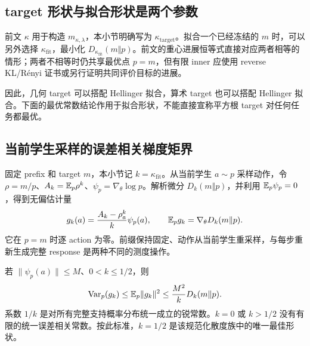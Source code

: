 \subsection{target 形状与拟合形状是两个参数}

前文 $\kappa$ 用于构造 $m_{\kappa,\lambda}$，本小节明确写为 $\kappa_{\mathrm{target}}$。拟合一个已经冻结的 $m$ 时，可以另外选择 $\kappa_{\mathrm{fit}}$，最小化 $D_{\kappa_{\mathrm{fit}}}(m\Vert p)$。前文的重心进展恒等式直接对应两者相等的情形；两者不相等时仍共享最优点 $p=m$，但有限 inner 应使用 reverse KL/Rényi 证书或另行证明共同评价目标的进展。

因此，几何 target 可以搭配 Hellinger 拟合，算术 target 也可以搭配 Hellinger 拟合。下面的最优常数结论作用于拟合形状，不能直接宣称平方根 target 对任何任务都最优。

\subsection{当前学生采样的误差相关梯度矩界}

固定 prefix 和 target $m$，本小节记 $k=\kappa_{\mathrm{fit}}$。从当前学生 $a\sim p$ 采样动作，令 $\rho=m/p$、$A_k=\mathbb E_p\rho^k$、$\psi_p=\nabla_\theta\log p$。解析微分 $D_k(m\Vert p)$，并利用 $\mathbb E_p\psi_p=0$，得到无偏估计量
\begin{equation}
 g_k(a)=\frac{A_k-\rho_a^k}{k}\psi_p(a),\qquad
 \mathbb E_pg_k=\nabla_\theta D_k(m\Vert p).
\end{equation}
它在 $p=m$ 时逐 action 为零。前缀保持固定、动作从当前学生重采样，与每步重新生成完整 response 是两种不同的测度操作。

\begin{theorem}[误差相关二阶矩的锐常数]
\label{thm:proximal-sharp-self-bound}
若 $\|\psi_p(a)\|\le M$、$0<k\le1/2$，则
\begin{equation}
 \operatorname{Var}_p(g_k)\le\mathbb E_p\|g_k\|^2
 \le\frac{M^2}{k}D_k(m\Vert p).
\end{equation}
系数 $1/k$ 是对所有完整支持概率分布统一成立的锐常数。$k=0$ 或 $k>1/2$ 没有有限的统一误差相关常数。按此标准，$k=1/2$ 是该规范化散度族中的唯一最佳形状。
\end{theorem}

